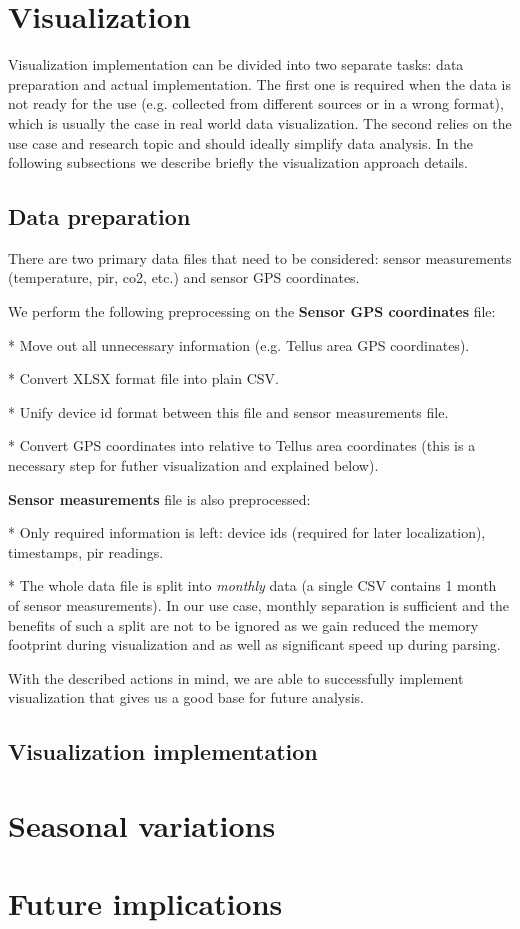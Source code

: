 \documentclass{article}
\title{
Exercise 2: IoT Data Analytics
\bigskip
\author{Andrei Golubev 2621924 \\ Hassan Shaheen 2600602}
\date{\parbox{\linewidth}{\centering
  \endgraf\bigskip
  University of Oulu, Oulu, Finland
  \endgraf\monthyeardate\today}}
}
\begin{document}
\maketitle
\thispagestyle{empty}
\newpage

\section{Visualization}

Visualization implementation can be divided into two separate tasks: data preparation and actual
implementation. The first one is required when the data is not ready for the use (e.g. collected
from different sources or in a wrong format), which is usually the case in real world data
visualization. The second relies on the use case and research topic and should ideally simplify data
analysis. In the following subsections we describe briefly the visualization approach details.

\subsection{Data preparation}

There are two primary data files that need to be considered: sensor measurements (temperature, pir,
co2, etc.) and sensor GPS coordinates.

We perform the following preprocessing on the \textbf{Sensor GPS coordinates} file:

* Move out all unnecessary information (e.g. Tellus area GPS coordinates).

* Convert XLSX format file into plain CSV.

* Unify device id format between this file and sensor measurements file.

* Convert GPS coordinates into relative to Tellus area coordinates (this is a necessary step for
futher visualization and explained below).

\textbf{Sensor measurements} file is also preprocessed:

* Only required information is left: device ids (required for later localization), timestamps, pir
readings.

* The whole data file is split into \textit{monthly} data (a single CSV contains 1 month of sensor
measurements). In our use case, monthly separation is sufficient and the benefits of such a split
are not to be ignored as we gain reduced the memory footprint during visualization and as well as
significant speed up during parsing.

With the described actions in mind, we are able to successfully implement visualization that gives
us a good base for future analysis.

\subsection{Visualization implementation}

\section{Seasonal variations}

\section{Future implications}
\end{document}
